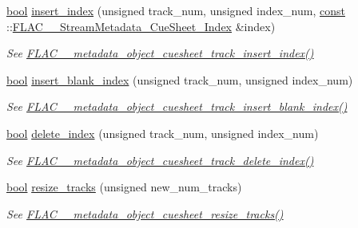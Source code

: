 \begin{DoxyCompactItemize}
\hyperlink{mac_2config_2i386_2lib-src_2libsoxr_2soxr-config_8h_abb452686968e48b67397da5f97445f5b}{bool} \hyperlink{class_f_l_a_c_1_1_metadata_1_1_cue_sheet_a5efe583c258df9c4737c27347dc69175}{insert\+\_\+index} (unsigned track\+\_\+num, unsigned index\+\_\+num, \hyperlink{getopt1_8c_a2c212835823e3c54a8ab6d95c652660e}{const} \+::\hyperlink{struct_f_l_a_c_____stream_metadata___cue_sheet___index}{F\+L\+A\+C\+\_\+\+\_\+\+Stream\+Metadata\+\_\+\+Cue\+Sheet\+\_\+\+Index} \&index)
\begin{DoxyCompactList}\small\item\em See \hyperlink{group__flac__metadata__object_ga2f8c5d80c409eff5ebd53ccd0c6f0984}{F\+L\+A\+C\+\_\+\+\_\+metadata\+\_\+object\+\_\+cuesheet\+\_\+track\+\_\+insert\+\_\+index()} \end{DoxyCompactList}\item 
\hyperlink{mac_2config_2i386_2lib-src_2libsoxr_2soxr-config_8h_abb452686968e48b67397da5f97445f5b}{bool} \hyperlink{class_f_l_a_c_1_1_metadata_1_1_cue_sheet_a4a046e4374c0c8fc7d3295d5cf9de023}{insert\+\_\+blank\+\_\+index} (unsigned track\+\_\+num, unsigned index\+\_\+num)
\begin{DoxyCompactList}\small\item\em See \hyperlink{group__flac__metadata__object_gaa1401ea99e4dc61d3eb034aed7d99602}{F\+L\+A\+C\+\_\+\+\_\+metadata\+\_\+object\+\_\+cuesheet\+\_\+track\+\_\+insert\+\_\+blank\+\_\+index()} \end{DoxyCompactList}\item 
\hyperlink{mac_2config_2i386_2lib-src_2libsoxr_2soxr-config_8h_abb452686968e48b67397da5f97445f5b}{bool} \hyperlink{class_f_l_a_c_1_1_metadata_1_1_cue_sheet_aff23e60e082c00e3b70d0ff9bf8dd1d0}{delete\+\_\+index} (unsigned track\+\_\+num, unsigned index\+\_\+num)
\begin{DoxyCompactList}\small\item\em See \hyperlink{group__flac__metadata__object_ga9cba3429dcc863714ceb1de6952c4737}{F\+L\+A\+C\+\_\+\+\_\+metadata\+\_\+object\+\_\+cuesheet\+\_\+track\+\_\+delete\+\_\+index()} \end{DoxyCompactList}\item 
\hyperlink{mac_2config_2i386_2lib-src_2libsoxr_2soxr-config_8h_abb452686968e48b67397da5f97445f5b}{bool} \hyperlink{class_f_l_a_c_1_1_metadata_1_1_cue_sheet_a402aaf611e67efdc2d67c57755162914}{resize\+\_\+tracks} (unsigned new\+\_\+num\+\_\+tracks)
\begin{DoxyCompactList}\small\item\em See \hyperlink{group__flac__metadata__object_gafb0e09fdcfb08c466ceb1f6bca961177}{F\+L\+A\+C\+\_\+\+\_\+metadata\+\_\+object\+\_\+cuesheet\+\_\+resize\+\_\+tracks()} \end{DoxyCompactList}\item 

\end{DoxyCompactItemize}
